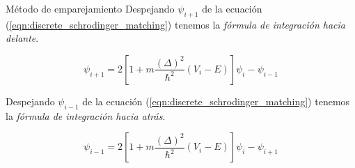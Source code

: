 \begin{frame}{Método de emparejamiento}
    Despejando $\psi_{i+1}$ de la ecuación (\ref{eqn:discrete_schrodinger_matching}) tenemos la \emph{fórmula de integración hacia delante}.

    \begin{equation}
        \psi_{i+1}
        =
        2\left[
            1+ m\frac{(\Delta)^2}{\hbar^2} (V_i - E) 
        \right] \psi_i - \psi_{i-1}
    \end{equation}

    Despejando $\psi_{i-1}$ de la ecuación (\ref{eqn:discrete_schrodinger_matching}) tenemos la \emph{fórmula de integración hacia atrás}.

    \begin{equation}
        \psi_{i-1}
        =
        2\left[
            1+ m\frac{(\Delta)^2}{\hbar^2} (V_i - E) 
        \right] \psi_i - \psi_{i+1}
    \end{equation}

\end{frame}